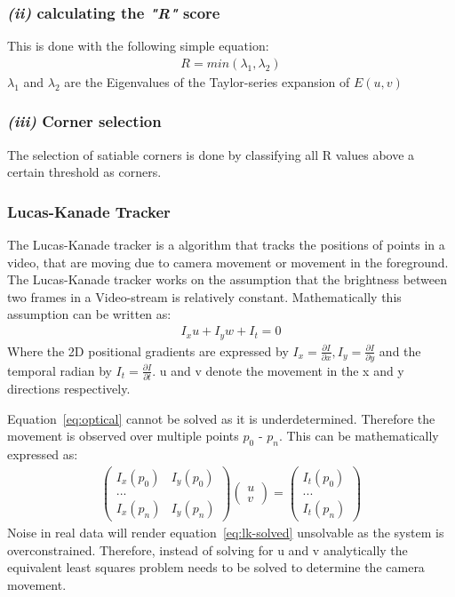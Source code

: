 \documentclass[11pt,a4paper]{article}
\begin{document}
\subsubsection*{\emph{(ii)} calculating the \textit{"R"} score} 

This is done with the following simple equation:
\begin{align}
   R = min(\lambda_1, \lambda_2) 
\end{align}
$\lambda_1$ and $\lambda_2$ are the Eigenvalues of the Taylor-series expansion of $E(u,v)$
\subsubsection*{\emph{(iii)} Corner selection} 
The selection of satiable corners is done by classifying all R values above a certain threshold as corners.

\subsubsection{Lucas-Kanade Tracker} \label{Sec:Lucas-Kanade}
The Lucas-Kanade tracker is a algorithm that tracks the positions of points in a video, that are moving due to camera movement or movement in the foreground.
The Lucas-Kanade tracker works on the assumption that the brightness between two frames in a Video-stream is relatively constant. 
Mathematically this assumption can be written as:
\begin{align} \label{eq:optical}
        I_x u + I_y w + I_t = 0 
    \end{align}
Where the 2D positional gradients are expressed by $I_x = \frac {\partial I} {\partial x}, I_y = \frac {\partial I} {\partial y}
$ and the temporal radian by $I_t = \frac {\partial I}{\partial t}$.
u and v denote the movement in the x and y directions respectively.

Equation~\ref{eq:optical} cannot be solved as it is underdetermined.
Therefore the movement is observed over multiple points $p_0$ - $p_n$.
This can be mathematically expressed as:
\begin{align} \label{eq:lk-solved}
    \begin{pmatrix}
        I_x(p_0) & I_y(p_0) \\  ... \\ I_x(p_n) & I_y(p_n)
    \end{pmatrix} 
    \begin{pmatrix}
       u \\ v
    \end{pmatrix} = 
    \begin{pmatrix}
        I_t(p_0) \\  ... \\ I_t(p_n) 
    \end{pmatrix} 
\end{align}
Noise in real data will render equation~\ref{eq:lk-solved} unsolvable as the system is overconstrained.
Therefore, instead of solving for u and v analytically the equivalent least squares problem needs to be solved to determine the camera movement.
\end{document}
